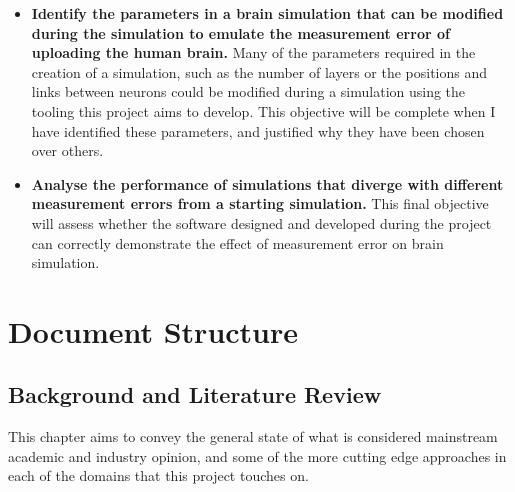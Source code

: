 \begin{itemize}
    \item \textbf{Identify the parameters in a brain simulation that can be
              modified during the simulation to emulate the measurement error of
              uploading the human brain.} Many of the parameters required in the
          creation of a simulation, such as the number of layers or the
          positions and links between neurons could be modified during a
          simulation using the tooling this project aims to develop. This
          objective will be complete when I have identified these
          parameters, and justified why they have been chosen over others.
    \item \textbf{Analyse the performance of simulations that diverge with
              different measurement errors from a starting simulation.} This
          final objective will assess whether the software designed and
          developed during the project can correctly demonstrate the effect
          of measurement error on brain simulation. 
\end{itemize}

% 

\section{Document Structure}

\subsection*{Background and Literature Review}
This chapter aims to convey the general state of what is considered mainstream
academic and industry opinion, and some of the more cutting edge approaches in
each of the domains that this project touches on.

